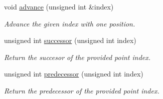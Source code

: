 \begin{DoxyCompactItemize}
void \hyperlink{classmultiscale_1_1MinEnclosingTriangleFinder_af52c24da93e4660f043dbb0f92594a19}{advance} (unsigned int \&index)
\begin{DoxyCompactList}\small\item\em \-Advance the given index with one position. \end{DoxyCompactList}\item 
unsigned int \hyperlink{classmultiscale_1_1MinEnclosingTriangleFinder_a075472a453bfcb0eedd06a4a185241fc}{successor} (unsigned int index)
\begin{DoxyCompactList}\small\item\em \-Return the succesor of the provided point index. \end{DoxyCompactList}\item 
unsigned int \hyperlink{classmultiscale_1_1MinEnclosingTriangleFinder_aa5ec6fafd63c6d99d095dfc58c47cd4e}{predecessor} (unsigned int index)
\begin{DoxyCompactList}\small\item\em \-Return the predecessor of the provided point index. \end{DoxyCompactList}\end{DoxyCompactItemize}
